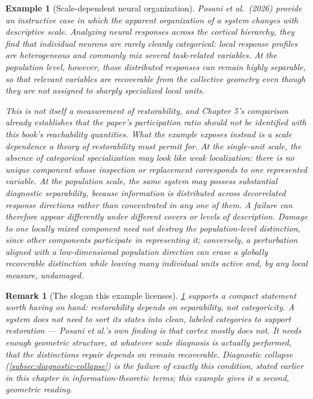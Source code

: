 \documentclass[12pt]{report}
\newtheorem{example}[definition]{Example}
\newtheorem{remark}[definition]{Remark}
\begin{document}
\begin{example}[Scale-dependent neural organization]
\label{ex:posani-scale}
Posani et al.\ (2026) provide an instructive case in which the apparent
organization of a system changes with descriptive scale. Analyzing
neural responses across the cortical hierarchy, they find that
individual neurons are rarely cleanly categorical: local response
profiles are heterogeneous and commonly mix several task-related
variables. At the population level, however, those distributed responses
can remain highly separable, so that relevant variables are recoverable
from the collective geometry even though they are not assigned to
sharply specialized local units.

This is not itself a measurement of restorability, and Chapter 5's
comparison already establishes that the paper's participation ratio
should not be identified with this book's reachability quantities. What
the example exposes instead is a scale dependence a theory of
restorability must permit for. At the single-unit scale, the absence of
categorical specialization may look like weak localization: there is no
unique component whose inspection or replacement corresponds to one
represented variable. At the population scale, the same system may
possess substantial diagnostic separability, because information is
distributed across decorrelated response directions rather than
concentrated in any one of them. A failure can therefore appear
differently under different covers or levels of description. Damage to
one locally mixed component need not destroy the population-level
distinction, since other components participate in representing it;
conversely, a perturbation aligned with a low-dimensional population
direction can erase a globally recoverable distinction while leaving
many individual units active and, by any local measure, undamaged.
\end{example}

\begin{remark}[The slogan this example licenses]
\label{rem:posani-slogan}
\cref{ex:posani-scale} supports a compact statement worth having on
hand: restorability depends on separability, not categoricity. A system
does not need to sort its states into clean, labeled categories to
support restoration --- Posani et al.'s own finding is that cortex
mostly does not. It needs enough geometric structure, at whatever scale
diagnosis is actually performed, that the distinctions repair depends on
remain recoverable. Diagnostic collapse (\cref{subsec:diagnostic-collapse})
is the failure of exactly this condition, stated earlier in this chapter
in information-theoretic terms; this example gives it a second,
geometric reading.
\end{remark}
\end{document}
